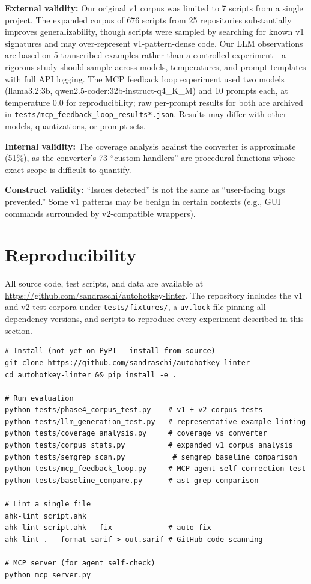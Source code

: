 \documentclass[11pt,a4paper]{article}
\begin{document}
\textbf{External validity:} Our original v1 corpus was limited to 7 scripts from a single project. The expanded corpus of 676 scripts from 25 repositories substantially improves generalizability, though scripts were sampled by searching for known v1 signatures and may over-represent v1-pattern-dense code. Our LLM observations are based on 5 transcribed examples rather than a controlled experiment---a rigorous study should sample across models, temperatures, and prompt templates with full API logging. The MCP feedback loop experiment used two models (llama3.2:3b, qwen2.5-coder:32b-instruct-q4\_K\_M) and 10 prompts each, at temperature 0.0 for reproducibility; raw per-prompt results for both are archived in \texttt{tests/mcp\_feedback\_loop\_results*.json}. Results may differ with other models, quantizations, or prompt sets.

\textbf{Internal validity:} The coverage analysis against the converter is approximate (51\%), as the converter's 73 ``custom handlers'' are procedural functions whose exact scope is difficult to quantify.

\textbf{Construct validity:} ``Issues detected'' is not the same as ``user-facing bugs prevented.'' Some v1 patterns may be benign in certain contexts (e.g., GUI commands surrounded by v2-compatible wrappers).

\section{Reproducibility}

All source code, test scripts, and data are available at \url{https://github.com/sandraschi/autohotkey-linter}. The repository includes the v1 and v2 test corpora under \texttt{tests/fixtures/}, a \texttt{uv.lock} file pinning all dependency versions, and scripts to reproduce every experiment described in this section.

\begin{lstlisting}[style=ahk,frame=none,numbers=none]
# Install (not yet on PyPI - install from source)
git clone https://github.com/sandraschi/autohotkey-linter
cd autohotkey-linter && pip install -e .

# Run evaluation
python tests/phase4_corpus_test.py    # v1 + v2 corpus tests
python tests/llm_generation_test.py   # representative example linting
python tests/coverage_analysis.py     # coverage vs converter
python tests/corpus_stats.py          # expanded v1 corpus analysis
python tests/semgrep_scan.py           # semgrep baseline comparison
python tests/mcp_feedback_loop.py     # MCP agent self-correction test
python tests/baseline_compare.py      # ast-grep comparison

# Lint a single file
ahk-lint script.ahk
ahk-lint script.ahk --fix             # auto-fix
ahk-lint . --format sarif > out.sarif # GitHub code scanning

# MCP server (for agent self-check)
python mcp_server.py
\end{lstlisting}
\end{document}
